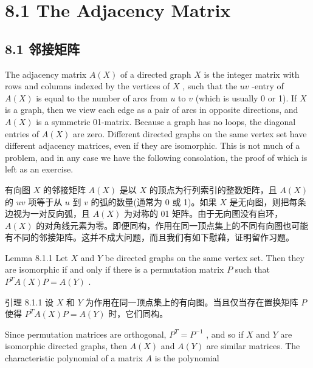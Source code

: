 \documentclass[10pt]{article}
\begin{document}
\section*{8.1 The Adjacency Matrix}

\begin{tcolorbox}\relax
\section*{8.1 邻接矩阵}
\end{tcolorbox}

The adjacency matrix \(A\left( X\right)\) of a directed graph \(X\) is the integer matrix with rows and columns indexed by the vertices of \(X\) , such that the \({uv}\) -entry of \(A\left( X\right)\) is equal to the number of arcs from \(u\) to \(v\) (which is usually 0 or 1). If \(X\) is a graph, then we view each edge as a pair of arcs in opposite directions, and \(A\left( X\right)\) is a symmetric 01-matrix. Because a graph has no loops, the diagonal entries of \(A\left( X\right)\) are zero. Different directed graphs on the same vertex set have different adjacency matrices, even if they are isomorphic. This is not much of a problem, and in any case we have the following consolation, the proof of which is left as an exercise.

\begin{tcolorbox}\relax
有向图 \(X\) 的邻接矩阵 \(A\left( X\right)\) 是以 \(X\) 的顶点为行列索引的整数矩阵，且 \(A\left( X\right)\) 的 \({uv}\) 项等于从 \(u\) 到 \(v\) 的弧的数量(通常为 0 或 1)。如果 \(X\) 是无向图，则把每条边视为一对反向弧，且 \(A\left( X\right)\) 为对称的 01 矩阵。由于无向图没有自环， \(A\left( X\right)\) 的对角线元素为零。即便同构，作用在同一顶点集上的不同有向图也可能有不同的邻接矩阵。这并不成大问题，而且我们有如下慰藉，证明留作习题。
\end{tcolorbox}

Lemma 8.1.1 Let \(X\) and \(Y\) be directed graphs on the same vertex set. Then they are isomorphic if and only if there is a permutation matrix \(P\) such that \({P}^{T}A\left( X\right) P = A\left( Y\right)\) .

\begin{tcolorbox}\relax
引理 8.1.1 设 \(X\) 和 \(Y\) 为作用在同一顶点集上的有向图。当且仅当存在置换矩阵 \(P\) 使得 \({P}^{T}A\left( X\right) P = A\left( Y\right)\) 时，它们同构。
\end{tcolorbox}

Since permutation matrices are orthogonal, \({P}^{T} = {P}^{-1}\) , and so if \(X\) and \(Y\) are isomorphic directed graphs, then \(A\left( X\right)\) and \(A\left( Y\right)\) are similar matrices. The characteristic polynomial of a matrix \(A\) is the polynomial
\end{document}
